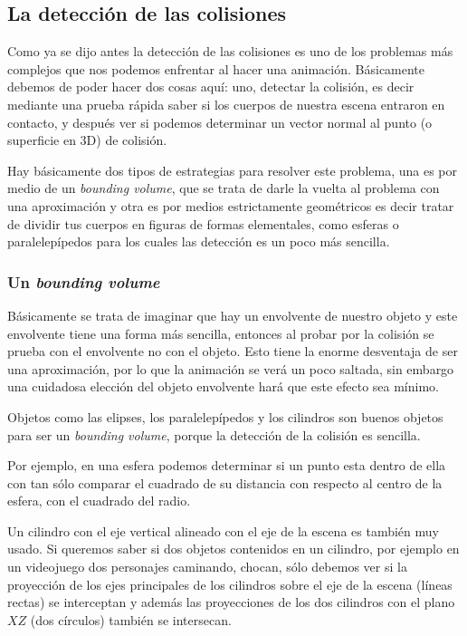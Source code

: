 \subsection{La detección de las colisiones}
Como ya se dijo antes la detección de las colisiones es uno de los problemas más complejos que nos podemos enfrentar al hacer una animación.
Básicamente debemos de poder hacer dos cosas aquí: uno, detectar la colisión, es decir mediante una prueba rápida saber si los cuerpos de nuestra escena entraron en contacto, y después ver si podemos determinar un vector normal al punto (o superficie en 3D) de colisión.

Hay básicamente dos tipos de estrategias para resolver este problema, una es por medio de un \emph{\textenglish{bounding volume}}, que se trata de darle la vuelta al problema con una aproximación y otra es por medios estrictamente geométricos es decir tratar de dividir tus cuerpos en figuras de formas elementales, como esferas o paralelepípedos para los cuales las detección es un poco más sencilla.

\subsubsection{Un \emph{\textenglish{bounding volume}}}
Básicamente se trata de imaginar que hay un envolvente de nuestro objeto y este envolvente tiene una forma más sencilla, entonces al probar por la colisión se prueba con el envolvente no con el objeto.
Esto tiene la enorme desventaja de ser una aproximación, por lo que la animación se verá un poco saltada, sin embargo una cuidadosa elección del objeto envolvente hará que este efecto sea mínimo.

Objetos como las elipses, los paralelepípedos y los cilindros son buenos objetos para ser un \emph{\textenglish{bounding volume}}, porque la detección de la colisión es sencilla.

Por ejemplo, en una esfera podemos determinar si un punto esta dentro de ella con tan sólo comparar el cuadrado de su distancia con respecto al centro de la esfera, con el cuadrado del radio. 

Un cilindro con el eje vertical alineado con el eje de la escena es también muy usado.
Si queremos saber si dos objetos contenidos en un cilindro, por ejemplo en un videojuego dos personajes caminando, chocan, sólo debemos ver si la proyección de los ejes principales de los cilindros sobre el eje de la escena (líneas rectas) se interceptan y además las proyecciones de los dos cilindros con el plano $XZ$ (dos círculos) también se intersecan.

